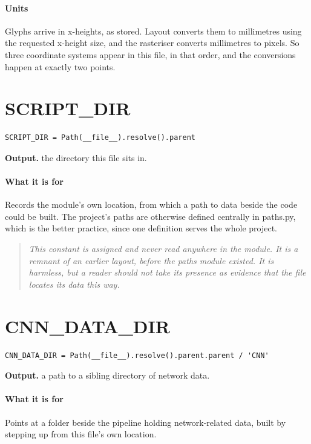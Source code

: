 \paragraph{Units}
Glyphs arrive in x-heights, as stored. Layout converts them to millimetres using the requested x-height size, and the rasteriser converts millimetres to pixels. So three coordinate systems appear in this file, in that order, and the conversions happen at exactly two points.


\section{SCRIPT\_DIR}
\begin{lstlisting}[style=sig]
SCRIPT_DIR = Path(__file__).resolve().parent
\end{lstlisting}

\noindent\textbf{Output.} the directory this file sits in.


\paragraph{What it is for}
Records the module's own location, from which a path to data beside the code could be built. The project's paths are otherwise defined centrally in paths.py, which is the better practice, since one definition serves the whole project.


\begin{quote}\small\itshape This constant is assigned and never read anywhere in the module. It is a remnant of an earlier layout, before the paths module existed. It is harmless, but a reader should not take its presence as evidence that the file locates its data this way.\end{quote}

\section{CNN\_DATA\_DIR}
\begin{lstlisting}[style=sig]
CNN_DATA_DIR = Path(__file__).resolve().parent.parent / 'CNN'
\end{lstlisting}

\noindent\textbf{Output.} a path to a sibling directory of network data.


\paragraph{What it is for}
Points at a folder beside the pipeline holding network-related data, built by stepping up from this file's own location.


